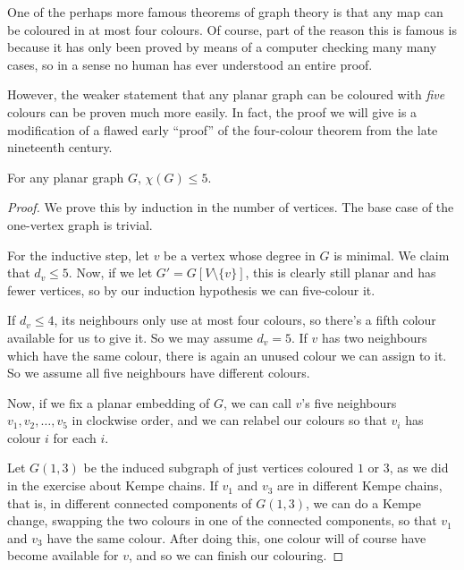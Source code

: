 \documentclass[nobib]{tufte-handout}
\begin{document}
One of the perhaps more famous theorems of graph theory is that any map can be coloured in at most four colours. Of course, part of the reason this is famous is because it has only been proved by means of a computer checking many many cases, so in a sense no human has ever understood an entire proof.

However, the weaker statement that any planar graph can be coloured with \emph{five} colours can be proven much more easily. In fact, the proof we will give is a modification of a flawed early ``proof'' of the four-colour theorem from the late nineteenth century.

\begin{theorem}
  For any planar graph $G$, $\chi(G) \leq 5$.

  \begin{proof}
    We prove this by induction in the number of vertices. The base case of the one-vertex graph is trivial.

    For the inductive step, let $v$ be a vertex whose degree in $G$ is minimal. We claim that $d_v \leq 5$. Now, if we let $G' = G[V \setminus \{v\}]$, this is clearly still planar and has fewer vertices, so by our induction hypothesis we can five-colour it.

    If $d_v \leq 4$, its neighbours only use at most four colours, so there's a fifth colour available for us to give it. So we may assume $d_v = 5$. If $v$ has two neighbours which have the same colour, there is again an unused colour we can assign to it. So we assume all five neighbours have different colours.

    Now, if we fix a planar embedding of $G$, we can call $v$'s five neighbours $v_1, v_2, \ldots, v_5$ in clockwise order, and we can relabel our colours so that $v_i$ has colour $i$ for each $i$.

    Let $G(1,3)$ be the induced subgraph of just vertices coloured $1$ or $3$, as we did in the exercise about Kempe chains. If $v_1$ and $v_3$ are in different Kempe chains, that is, in different connected components of $G(1,3)$, we can do a Kempe change, swapping the two colours in one of the connected components, so that $v_1$ and $v_3$ have the same colour. After doing this, one colour will of course have become available for $v$, and so we can finish our colouring.


\end{proof}
\end{theorem}
\end{document}
